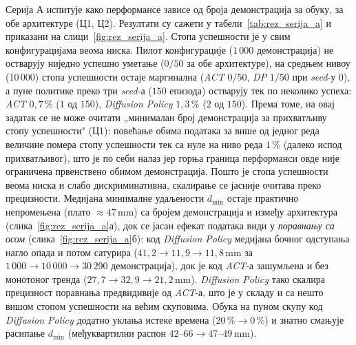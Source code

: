 \documentclass[12pt, a4paper]{article}
\begin{document}
Серија А испитује како перформансе зависе од броја демонстрација за обуку, за обе архитектуре (Ц1, Ц2).
Резултати су сажети у табели~\ref{tab:rez_serija_a} и приказани на слици~\ref{fig:rez_serija_a}.
Стопа успешности је у свим конфигурацијама веома ниска.
Пилот конфигурације ($1\,000$ демонстрација) не остварују ниједно успешно уметање ($0/50$ за обе архитектуре), на средњем нивоу ($10\,000$) стопа успешности остаје маргинална (\textit{ACT} $0/50$, \textit{DP} $1/50$ при \textit{seed}-у $0$), а пуне политике преко три \textit{seed}-а ($150$ епизода) остварују тек по неколико успеха: \textit{ACT} $0{,}7\,\%$ ($1$ од $150$), \textit{Diffusion Policy} $1{,}3\,\%$ ($2$ од $150$).
Према томе, на овај задатак се не може очитати „минималан број демонстрација за прихватљиву стопу успешности" (Ц1): повећање обима података за више од једног реда величине помера стопу успешности тек са нуле на ниво реда $1\,\%$ (далеко испод прихватљивог), што је по себи налаз јер горња граница перформанси овде није ограничена првенствено обимом демонстрација.
Пошто је стопа успешности веома ниска и слабо дискриминативна, скалирање се јасније очитава преко прецизности.
Медијана минималне удаљености $d_{\min}$ остаје практично непромењена (плато $\approx 47$\,mm) са бројем демонстрација и између архитектура (слика~\ref{fig:rez_serija_a}а), док се јасан ефекат података види у \emph{поравнању са осом} (слика~\ref{fig:rez_serija_a}б): код \textit{Diffusion Policy} медијана бочног одступања нагло опада и потом сатурира ($41{,}2 \to 11{,}9 \to 11{,}8$\,mm за $1\,000 \to 10\,000 \to 30\,290$ демонстрација), док је код \textit{ACT}-а зашумљена и без монотоног тренда ($27{,}7 \to 32{,}9 \to 21{,}2$\,mm).
\textit{Diffusion Policy} тако скалира прецизност поравнања предвидивије од \textit{ACT}-а, што је у складу и са нешто вишом стопом успешности на већим скуповима.
Обука на пуном скупу код \textit{Diffusion Policy} додатно уклања истеке времена ($20\,\% \to 0\,\%$) и знатно смањује расипање $d_{\min}$ (међуквартилни распон $42\text{–}66 \to 47\text{–}49$\,mm).
\end{document}
